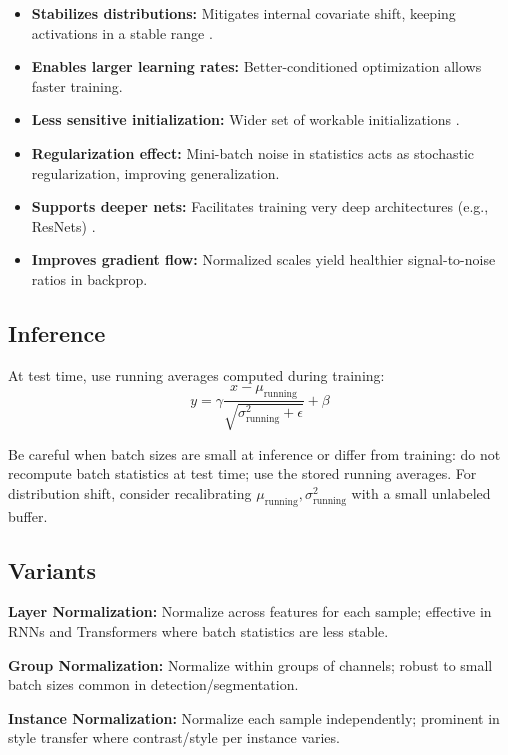 \begin{itemize}
    \item \textbf{Stabilizes distributions:} Mitigates internal covariate shift, keeping activations in a stable range \cite{Ioffe2015}.
    \item \textbf{Enables larger learning rates:} Better-conditioned optimization allows faster training.
    \item \textbf{Less sensitive initialization:} Wider set of workable initializations \cite{GoodfellowEtAl2016}.
    \item \textbf{Regularization effect:} Mini-batch noise in statistics acts as stochastic regularization, improving generalization.
    \item \textbf{Supports deeper nets:} Facilitates training very deep architectures (e.g., ResNets) \cite{He2016}.
    \item \textbf{Improves gradient flow:} Normalized scales yield healthier signal-to-noise ratios in backprop.
\end{itemize}

\subsection{Inference}

At test time, use running averages computed during training:
\begin{equation}
y = \gamma \frac{x - \mu_{\text{running}}}{\sqrt{\sigma^2_{\text{running}} + \epsilon}} + \beta
\end{equation}

Be careful when batch sizes are small at inference or differ from training: do not recompute batch statistics at test time; use the stored running averages. For distribution shift, consider recalibrating $\mu_{\text{running}}, \sigma^2_{\text{running}}$ with a small unlabeled buffer.

\subsection{Variants}

\textbf{Layer Normalization:} Normalize across features for each sample; effective in RNNs and Transformers where batch statistics are less stable.

\textbf{Group Normalization:} Normalize within groups of channels; robust to small batch sizes common in detection/segmentation.

\textbf{Instance Normalization:} Normalize each sample independently; prominent in style transfer where contrast/style per instance varies.

